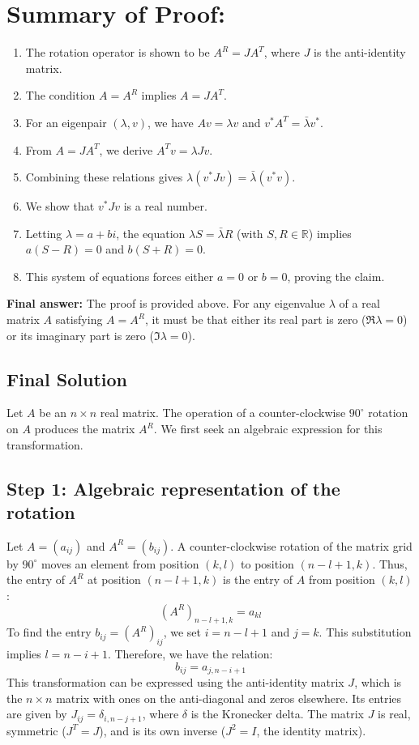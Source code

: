 \documentclass[12pt,a4paper]{article}
\theoremstyle{definition}
\begin{document}
        \section*{Summary of Proof:}
        \begin{enumerate}
            \item The rotation operator is shown to be $A^R = JA^T$, where $J$ is the anti-identity matrix.
            \item The condition $A=A^R$ implies $A=JA^T$.
            \item For an eigenpair $(\lambda, v)$, we have $Av=\lambda v$ and $v^*A^T = \bar{\lambda}v^*$.
            \item From $A=JA^T$, we derive $A^Tv = \lambda Jv$.
            \item Combining these relations gives $\lambda(v^*Jv) = \bar{\lambda}(v^*v)$.
            \item We show that $v^*Jv$ is a real number.
            \item Letting $\lambda = a+bi$, the equation $\lambda S = \bar{\lambda} R$ (with $S,R \in \mathbb{R}$) implies $a(S-R)=0$ and $b(S+R)=0$.
            \item This system of equations forces either $a=0$ or $b=0$, proving the claim.
        \end{enumerate}

        \textbf{Final answer:}
        The proof is provided above. For any eigenvalue $\lambda$ of a real matrix $A$ satisfying $A=A^R$, it must be that either its real part is zero ($\Re\lambda=0$) or its imaginary part is zero ($\Im\lambda=0$).


    \subsection{Final Solution}
    Let $A$ be an $n \times n$ real matrix. The operation of a counter-clockwise $90^\circ$ rotation on $A$ produces the matrix $A^R$. We first seek an algebraic expression for this transformation.

    \subsection*{Step 1: Algebraic representation of the rotation}
    Let $A = (a_{ij})$ and $A^R = (b_{ij})$. A counter-clockwise rotation of the matrix grid by $90^\circ$ moves an element from position $(k,l)$ to position $(n-l+1, k)$. Thus, the entry of $A^R$ at position $(n-l+1, k)$ is the entry of $A$ from position $(k,l)$:
    $$(A^R)_{n-l+1, k} = a_{kl}$$
    To find the entry $b_{ij} = (A^R)_{ij}$, we set $i = n-l+1$ and $j=k$. This substitution implies $l=n-i+1$. Therefore, we have the relation:
    $$b_{ij} = a_{j, n-i+1}$$
    This transformation can be expressed using the anti-identity matrix $J$, which is the $n \times n$ matrix with ones on the anti-diagonal and zeros elsewhere. Its entries are given by $J_{ij} = \delta_{i, n-j+1}$, where $\delta$ is the Kronecker delta. The matrix $J$ is real, symmetric ($J^T=J$), and is its own inverse ($J^2=I$, the identity matrix).
\end{document}
